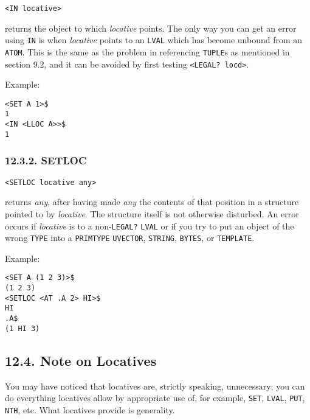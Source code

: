 \documentclass[a4paper,]{article}
\begin{document}
\begin{verbatim}
<IN locative>
\end{verbatim}

 returns the object to which \emph{locative} points. The only way you can get an error using
\texttt{IN} is when \emph{locative} points to an \texttt{LVAL} which has become unbound from an \texttt{ATOM}. This is the
same as the problem in referencing \texttt{TUPLE}s as mentioned in section 9.2, and it can be avoided by first testing
\texttt{\textless{}LEGAL?\ locd\textgreater{}}.

Example:

\begin{verbatim}
<SET A 1>$
1
<IN <LLOC A>>$
1
\end{verbatim}

\subsubsection{12.3.2. SETLOC}\label{setloc}

\begin{verbatim}
<SETLOC locative any>
\end{verbatim}

 returns \emph{any}, after having made \emph{any} the contents of that position in a
structure pointed to by \emph{locative}. The structure itself is not otherwise disturbed. An error occurs if
\emph{locative} is to a non-\texttt{LEGAL?} \texttt{LVAL} or if you try to put an object of the wrong \texttt{TYPE} into a
\texttt{PRIMTYPE} \texttt{UVECTOR}, \texttt{STRING}, \texttt{BYTES}, or \texttt{TEMPLATE}.

Example:

\begin{verbatim}
<SET A (1 2 3)>$
(1 2 3)
<SETLOC <AT .A 2> HI>$
HI
.A$
(1 HI 3)
\end{verbatim}

\subsection{12.4. Note on Locatives}\label{note-on-locatives}

You may have noticed that locatives are, strictly speaking, unnecessary; you can do everything locatives allow by
appropriate use of, for example, \texttt{SET}, \texttt{LVAL}, \texttt{PUT}, \texttt{NTH}, etc. What
locatives provide is generality.
\end{document}
